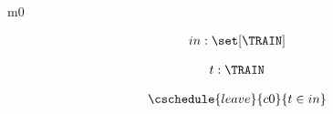 \documentclass[12pt]{amsart}
\title{}
\author{}
\date{} %
\begin{document}
\maketitle
\tableofcontents


\begin{machine}{m0}


%
	\begin{align*}
\variable{		in : \set[\TRAIN]}
	\end{align*}
%




\begin{align*}
\dummy{	t : \TRAIN}
\end{align*}

\begin{align*}
\cschedule{leave}{c0}
{	t \in in	}
\end{align*}


\end{machine}
\end{document}
